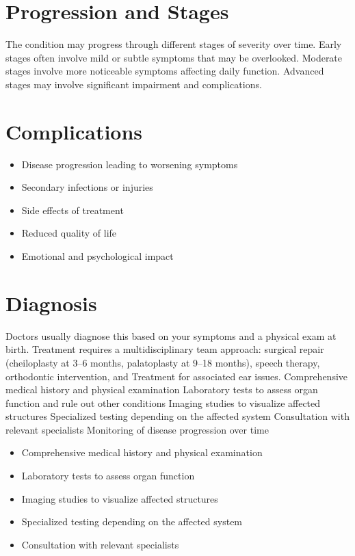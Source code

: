 \section{Progression and Stages}
The condition may progress through different stages of severity over time. Early stages often involve mild or subtle symptoms that may be overlooked. Moderate stages involve more noticeable symptoms affecting daily function. Advanced stages may involve significant impairment and complications.
\section{Complications}
\begin{itemize}[noitemsep]
  \item Disease progression leading to worsening symptoms
  \item Secondary infections or injuries
  \item Side effects of treatment
  \item Reduced quality of life
  \item Emotional and psychological impact
\end{itemize}
\section{Diagnosis}
Doctors usually diagnose this based on your symptoms and a physical exam at birth. Treatment requires a multidisciplinary team approach: surgical repair (cheiloplasty at 3--6 months, palatoplasty at 9--18 months), speech therapy, orthodontic intervention, and Treatment for associated ear issues. Comprehensive medical history and physical examination Laboratory tests to assess organ function and rule out other conditions Imaging studies to visualize affected structures Specialized testing depending on the affected system Consultation with relevant specialists Monitoring of disease progression over time

\begin{itemize}[noitemsep]
  \item Comprehensive medical history and physical examination
  \item Laboratory tests to assess organ function
  \item Imaging studies to visualize affected structures
  \item Specialized testing depending on the affected system
  \item Consultation with relevant specialists
\end{itemize}
